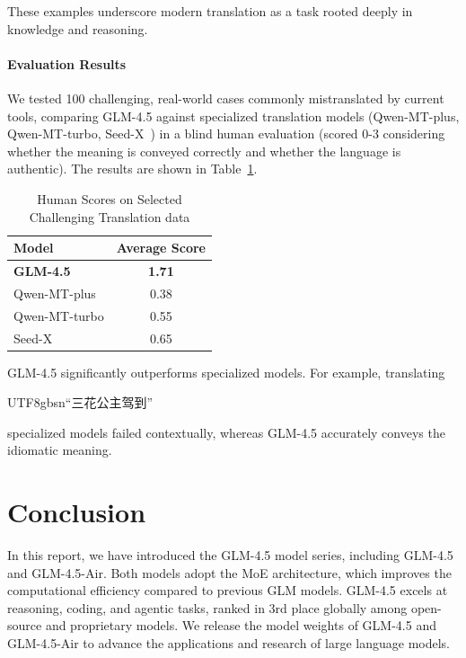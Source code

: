 \documentclass{article}
\theoremstyle{definition}
\begin{document}
These examples underscore modern translation as a task rooted deeply in knowledge and reasoning.

\paragraph{Evaluation Results} We tested 100 challenging, real-world cases commonly mistranslated by current tools, comparing GLM-4.5 against specialized translation models (Qwen-MT-plus, Qwen-MT-turbo, Seed-X~\cite{cheng2025seed}) in a blind human evaluation (scored 0-3 considering whether the meaning is conveyed correctly and whether the language is authentic). The results are shown in Table~\ref{tab:translation}.

\begin{table}[ht]
    \centering
    
    \caption{ Human Scores on Selected Challenging Translation data}
    \begin{tabular}{l c}
    \toprule
    Model & Average Score \\
    \midrule
    \textbf{GLM-4.5}     & \textbf{1.71} \\
    Qwen-MT-plus         & 0.38 \\
    Qwen-MT-turbo        & 0.55 \\
    Seed-X               & 0.65 \\
    \bottomrule
    \end{tabular}
    \label{tab:translation}
\end{table}

GLM-4.5 significantly outperforms specialized models. For example, translating \begin{CJK*}{UTF8}{gbsn}``三花公主驾到''\end{CJK*} specialized models failed contextually, whereas GLM-4.5 accurately conveys the idiomatic meaning.

\section{Conclusion}
In this report, we have introduced the GLM-4.5 model series, including GLM-4.5 and GLM-4.5-Air. Both models adopt the MoE architecture, which improves the computational efficiency compared to previous GLM models. GLM-4.5 excels at reasoning, coding, and agentic tasks, ranked in 3rd place globally among open-source and proprietary models. We release the model weights of GLM-4.5 and GLM-4.5-Air to advance the applications and research of large language models.
\newpage
\end{document}
